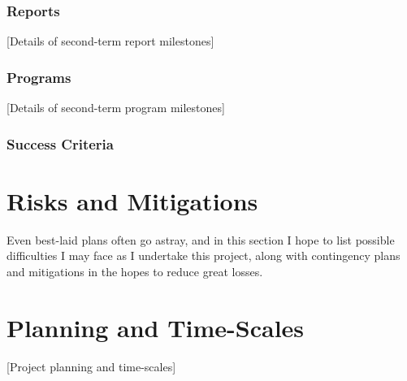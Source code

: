 \documentclass[letterpaper,11pt]{article}
\begin{document}
\subsubsection{Reports}
[Details of second-term report milestones]

\subsubsection{Programs}
[Details of second-term program milestones]

\subsubsection{Success Criteria}

\section{Risks and Mitigations}
Even best-laid plans often go astray, and in this section I hope to list possible difficulties I may face as I undertake this project, along with contingency plans and mitigations in the hopes to reduce great losses.


\section{Planning and Time-Scales}
[Project planning and time-scales]


\end{document}
